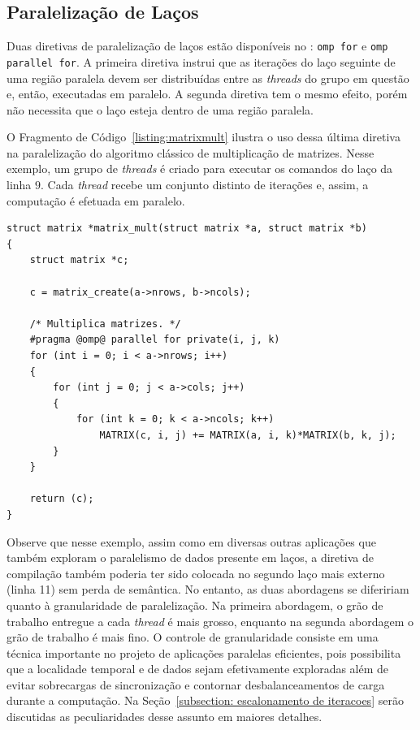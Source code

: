 \documentclass{SBCbookchapter}
\begin{document}
	\subsection{Paralelização de Laços}
	\label{subsection: paralelização de lacos}

		Duas diretivas de paralelização de laços estão disponíveis no
		\openmp: \texttt{omp for} e \texttt{omp parallel for}. A
		primeira diretiva instrui que as iterações do laço seguinte de
		uma região paralela devem ser distribuídas entre as
		\textit{threads} do grupo em questão e, então, executadas em
		paralelo. A segunda diretiva tem o mesmo efeito, porém não
		necessita que o laço esteja dentro de uma região paralela. 
				
		O Fragmento de Código~\ref{listing:matrixmult} ilustra o uso dessa
		última diretiva na paralelização do algoritmo clássico de
		multiplicação de matrizes. Nesse exemplo, um grupo de
		\textit{threads} é criado para executar os comandos do laço da
		linha $9$. Cada \textit{thread} recebe um conjunto distinto de
		iterações e, assim, a computação é efetuada em paralelo. 

\begin{lstlisting}[frame=single,float,floatplacement=t,caption=Paralelização da multiplicação de matrizes no \openmp.,label=listing:matrixmult]
struct matrix *matrix_mult(struct matrix *a, struct matrix *b)
{
	struct matrix *c;

	c = matrix_create(a->nrows, b->ncols);

	/* Multiplica matrizes. */
	#pragma @omp@ parallel for private(i, j, k)
	for (int i = 0; i < a->nrows; i++)
	{
		for (int j = 0; j < a->cols; j++)
		{
			for (int k = 0; k < a->ncols; k++)
				MATRIX(c, i, j) += MATRIX(a, i, k)*MATRIX(b, k, j);
		}
	}

	return (c);
}
\end{lstlisting}		

		Observe que nesse exemplo, assim como em diversas outras
		aplicações que também exploram o paralelismo de dados presente
		em laços, a diretiva de compilação também poderia ter sido
		colocada no segundo laço mais externo (linha 11) sem perda de semântica. No
		entanto, as duas abordagens se difeririam quanto à granularidade
		de paralelização. Na primeira abordagem, o grão de trabalho
		entregue a cada \textit{thread} é mais grosso, enquanto na
		segunda abordagem o grão de trabalho é mais fino. O controle de
		granularidade consiste em uma técnica importante no projeto de
		aplicações paralelas eficientes, pois possibilita que a
		localidade temporal e de dados sejam efetivamente exploradas
		além de evitar sobrecargas de sincronização e contornar
		desbalanceamentos de carga durante a computação. Na
		Seção~\ref{subsection: escalonamento de iteracoes} serão
		discutidas as peculiaridades desse assunto em maiores detalhes.
\end{document}
